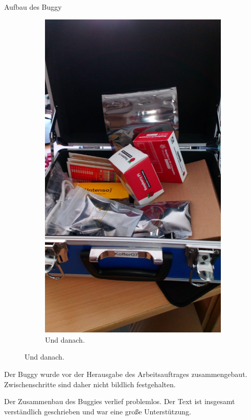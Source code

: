 \documentclass[12pt]{report}
\begin{document}
\begin{section}{Aufbau des Buggy}
\begin{figure}[h!]
\begin{subfigure}{0.45\linewidth}
    \includegraphics[width=\linewidth]{lernportfolio_assets/Buggy_Koffer.jpeg}
    \caption{Und danach.}
  \end{subfigure}
\end{figure}

Der Buggy wurde vor der Herausgabe des Arbeitsauftrages zusammengebaut. Zwischenschritte sind daher nicht bildlich festgehalten. 

Der Zusammenbau des Buggies verlief problemlos. Der Text ist insgesamt verständlich geschrieben und war eine große Unterstützung.


\end{section}
\end{document}
